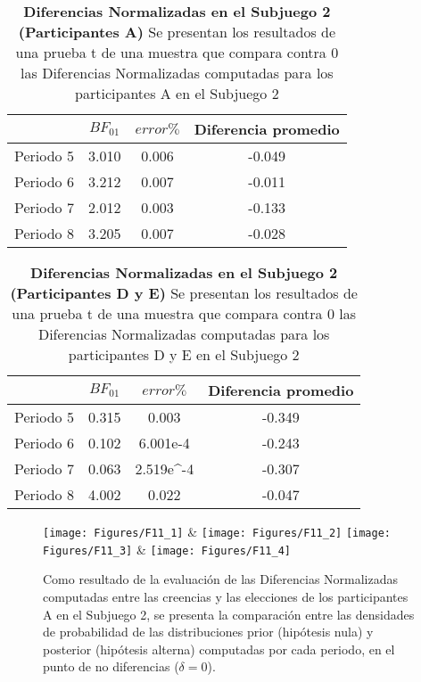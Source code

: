 \begin{table}[h]
\caption[Diferencias Normalizadas en el Subjuego 2; Participante A (Pruebas t de una muestra)]{\textbf{Diferencias Normalizadas en el Subjuego 2 (Participantes A)} Se presentan los resultados de una prueba t de una muestra que compara contra 0 las Diferencias Normalizadas computadas para los participantes A en el Subjuego 2}
\label{DN-S2-A-B}
\centering
\begin{tabular}{l | c c | c}
\toprule
\textbf{} & \textbf{$BF_{01}$} & \textbf{$error\%$} & \textbf{Diferencia promedio}\\
\midrule
Periodo 5 & 3.010 & 0.006 & -0.049\\
Periodo 6 & 3.212 & 0.007 & -0.011\\
Periodo 7 & 2.012 & 0.003 & -0.133\\
Periodo 8 & 3.205 & 0.007 & -0.028\\
\bottomrule
\end{tabular}
\end{table}

\begin{table}[h]
\caption[Diferencias Normalizadas en el Subjuego 2; Participantes D y E (Pruebas t de una muestra)]{\textbf{Diferencias Normalizadas en el Subjuego 2 (Participantes D y E)} Se presentan los resultados de una prueba t de una muestra que compara contra 0 las Diferencias Normalizadas computadas para los participantes D y E en el Subjuego 2}
\label{DN-S2-DyE-B}
\centering
\begin{tabular}{l | c c | c}
\toprule
\textbf{} & \textbf{$BF_{01}$} & \textbf{$error\%$} & \textbf{Diferencia promedio}\\
\midrule
Periodo 5 & 0.315 & 0.003 & -0.349\\
Periodo 6 & 0.102 & 6.001e-4 & -0.243\\
Periodo 7 & 0.063 & 2.519e^-4 & -0.307\\
Periodo 8 & 4.002 & 0.022 & -0.047\\
\bottomrule
\end{tabular}
\end{table}
  

\begin{figure}[h]
\centering
\texttt{[image: Figures/F11\_1]} & \texttt{[image: Figures/F11\_2]} 
\texttt{[image: Figures/F11\_3]} & \texttt{[image: Figures/F11\_4]} 
\decoRule
\caption[Evaluación de las Diferencias Normalizadas entre creencias y elecciones en los participantes A en el Subjuego 2 (Factor de Bayes)]{Como resultado de la evaluación de las Diferencias Normalizadas computadas entre las creencias y las elecciones de los participantes A en el Subjuego 2, se presenta la comparación entre las densidades de probabilidad de las distribuciones prior (hipótesis nula) y posterior (hipótesis alterna) computadas por cada periodo, en el punto de no diferencias ($\delta = 0$).}
\label{fig:DN_S2_A}
\end{figure}  


